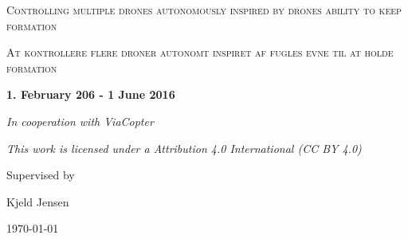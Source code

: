 \begin{titlepage}
	\centering
	{\scshape\LARGE Controlling multiple drones autonomously inspired by drones ability to keep formation \par}
	\vspace{1cm}
	{\scshape\Large At kontrollere flere droner autonomt inspiret af fugles evne til at holde formation\par}
	\vspace{1.5cm}
	{\large\bfseries 1. February 206 - 1 June 2016\par}
	\vspace{2cm}
	{\Large\itshape In cooperation with ViaCopter\par}
	\vspace{2cm}
	{\Large\itshape  This work is licensed under a  Attribution 4.0 International (CC BY 4.0)\par}
	\vfill
	Supervised by\par
	Kjeld Jensen

	\vfill

	{\large \today\par}
\end{titlepage}

